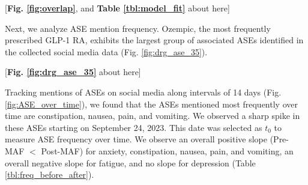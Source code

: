 \documentclass[referee,bst/sn-basic]{sn-jnl}%
\begin{document}
\begin{center}
    [\textbf{Fig. \ref{fig:overlap}}, and \textbf{Table \ref{tbl:model_fit}} about here]
\end{center}

\begin{comment}
\begin{figure}[H]
    \centering
    \texttt{[image: images/overlap.pdf]}
    \caption{Overlap score as a function of $I_{f\%}$.
    }
    \label{fig:overlap}
\end{figure}
\end{comment}




Next, we analyze ASE mention frequency.
Ozempic, the most frequently prescribed GLP-1 RA, exhibits the largest group of associated ASEs identified in the collected social media data (Fig. \ref{fig:drg_ase_35}).

\begin{center}
    [\textbf{Fig. \ref{fig:drg_ase_35}} about here]
\end{center}

\begin{comment}
\begin{figure}
    \ContinuedFloat
    \centering
    \begin{subfigure}[b]{\textwidth}
        \centering
        \texttt{[image: images/1.pdf]}
        \label{fig:drg_ase_35a}
    \end{subfigure}
    \stepcounter{figure} %
    \caption{ASE mention frequency ($>1$) on $\mathbb{X}$ and Reddit for each GLP-1 receptor agonist.}
    \label{fig:drg_ase_35}
\end{figure}
\end{comment}

Tracking mentions of ASEs on social media along intervals of 14 days (Fig. \ref{fig:ASE_over_time}), we found that the ASEs mentioned most frequently over time are constipation, nausea, pain, and vomiting. 
We observed a sharp spike in these ASEs starting on September 24, 2023.
This date was selected as $t_0$ to measure ASE frequency over time.
We observe an overall positive slope (Pre-MAF $<$ Post-MAF) for anxiety, constipation, nausea, pain, and vomiting, an overall negative slope for fatigue, and no slope for depression (Table \ref{tbl:freq_before_after}).
\end{document}
